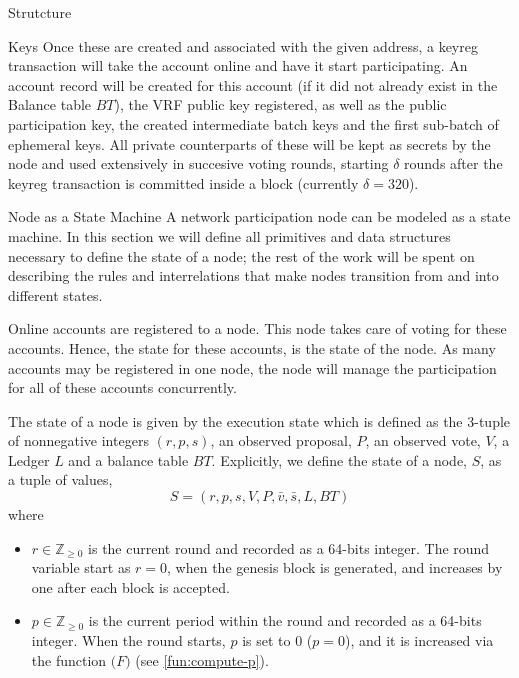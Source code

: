 \documentclass[10pt,a4paper]{article}
\begin{document}
\begin{section}{Strutcture}
\begin{subsection}{Keys}
    Once these are created and associated with the given address, a keyreg transaction will take the account
    online and have it start participating. An account record will be created for this account (if it did not
    already exist in the Balance table $BT$), the VRF public key registered, as well as the public participation
    key, the created intermediate batch keys and the first sub-batch of ephemeral keys. All private counterparts of 
    these will be kept as secrets by the node and used extensively in succesive voting rounds, 
    starting $\delta$ rounds after the keyreg transaction is committed inside a block (currently $\delta = 320$).




\end{subsection}
\begin{subsection}{Node as a State Machine}
A network participation node can be modeled as a state machine.
In this section we will define all primitives and data structures necessary to define the state
of a node; the rest of the work will be spent on describing the rules and interrelations that
make nodes transition from and into different states.

Online accounts are registered to a node. This node takes care of voting for these accounts.
Hence, the state for these accounts, is the state of the node. As many accounts may be 
registered in one node, the node will manage the participation for all of these accounts 
concurrently.

The {\sf state of a node} 
is given by the {\sf execution state} which is defined as the 3-tuple of nonnegative integers $(r, p, s)$, 
an observed proposal, $P$, 
an observed vote, $V$, 
a Ledger $L$ and 
a balance table $BT$.
Explicitly, we define the state of a node, $S$, as a tuple of values, 
$$
S = (r, p, s, V, P, \bar{v}, \bar{s}, L, BT)
$$ 
where
\begin{itemize}
    \item 
    $r\in\mathbb{Z}_{\ge 0}$ is the current round and recorded as a 64-bits integer. 
    The round variable start as $r=0$, when the genesis block is generated, and increases
    by one after each block is accepted.
    
    \item 
    $p\in\mathbb{Z}_{\ge 0}$ is the current period within the round and recorded as 
    a 64-bits integer. When the round starts, $p$ is set to 0 ($p=0$), and it is 
    increased via the function $\mathcal(F)$ (see \ref{fun:compute-p}).
    

\end{itemize}
\end{subsection}
\end{section}
\end{document}
